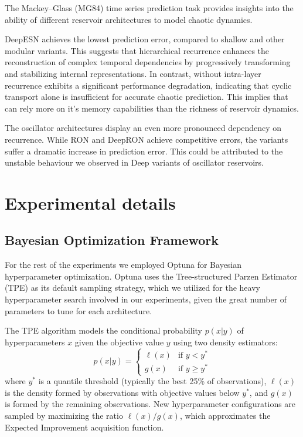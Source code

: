 The Mackey–Glass (MG84) time series prediction task provides insights into the ability 
of different reservoir architectures to model chaotic dynamics.

DeepESN achieves the lowest prediction error, compared to shallow and other modular variants. 
This suggests that hierarchical recurrence enhances the reconstruction of complex temporal dependencies by
 progressively transforming and stabilizing internal representations. 
In contrast, \DCR\@ without intra-layer
recurrence exhibits a significant performance degradation, indicating that cyclic transport 
alone is insufficient for accurate chaotic prediction. This implies that \DCR\@ can rely more on it's memory
capabilities than the richness of reservoir dynamics.

The oscillator architectures display an even more pronounced dependency on recurrence. 
While RON and DeepRON achieve competitive errors, the \DCO variants suffer a dramatic increase in prediction error.
This could be attributed to the unstable behaviour we observed in Deep variants of oscillator reservoirs.


\clearpage
\section{Experimental details}

\subsection{Bayesian Optimization Framework}

For the rest of the experiments we employed Optuna \cite{optuna_2019} for Bayesian hyperparameter optimization.
 Optuna uses the Tree-structured Parzen Estimator (TPE) \cite{bergstra2011algorithms}
  as its default sampling strategy, which we utilized for the heavy hyperparameter search involved in our experiments, given the great number of parameters to tune for each architecture.

The TPE algorithm models the conditional probability $p(x|y)$ of hyperparameters $x$ given the objective value $y$ using two density estimators:
\begin{equation}
p(x|y) = \begin{cases}
\ell(x) & \text{if } y < y^* \\
g(x) & \text{if } y \geq y^*
\end{cases}
\end{equation}
where $y^*$ is a quantile threshold (typically the best 25\% of observations), $\ell(x)$ 
is the density formed by observations with objective values below $y^*$, and $g(x)$ is formed by the remaining observations.
 New hyperparameter configurations are sampled by maximizing the ratio $\ell(x)/g(x)$,
  which approximates the Expected Improvement acquisition function.

